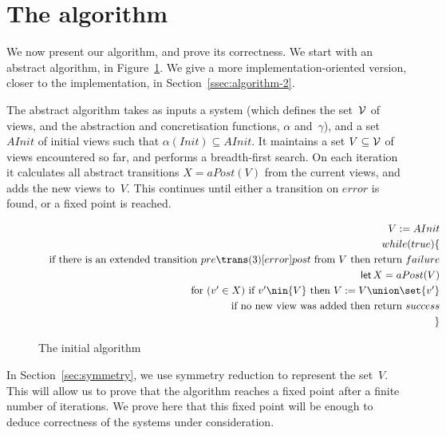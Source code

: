 \section{The algorithm}

We now present our algorithm, and prove its correctness.  We start with an
abstract algorithm, in Figure~\ref{fig:algorithm}.  We give a more
implementation-oriented version, closer to the implementation, in
Section~\ref{ssec:algorithm-2}.

The abstract algorithm takes as inputs a system (which defines the set~$\mathcal{V}$ of
views, and the abstraction and concretisation functions, $\alpha$
and~$\gamma$), and a set $AInit$ of initial views such that $\alpha(Init)
\subseteq {AInit}$.  It maintains a set $V \subseteq \mathcal{V}$ of views encountered
so far, and performs a breadth-first search.  On each iteration it calculates
all abstract transitions $X = aPost(V)$ from the current views, and adds the
new views to~$V$.  This continues until either a transition on $error$ is
found, or a fixed point is reached.

\begin{figure}[t]
\[
\begin{align}
V := AInit \\
while(true)\{ \\
\quad \mbox{if there is an extended transition $pre \trans(3)[error] post$
  from~${V}$ then return $failure$} \\
\quad \Let  X = aPost({V}) \\
\quad \mbox{for $(v' \in X)$ if $v' \nin {V}$ then 
  $V := V \union \set{v'}$} \\
\quad \mbox{if no new view was added then return $success$} \\ 
\}
\end{align}
\]
\caption{The initial algorithm}
\label{fig:algorithm}
\end{figure}


In Section~\ref{sec:symmetry}, we use symmetry reduction to represent the
set~$V$.  This will allow us to prove that the algorithm reaches a fixed point
after a finite number of iterations.  We prove here that this fixed point will
be enough to deduce correctness of the systems under consideration. 


